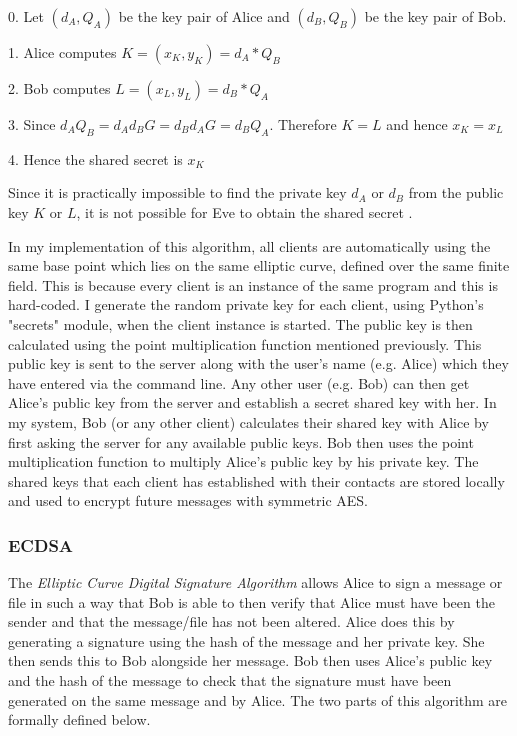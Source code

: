 \documentclass[12pt,a4paper]{article}
\begin{document}
\vspace{1mm}

0. \space Let $(d_A,Q_A)$ be the key pair of Alice and $(d_B,Q_B)$ be the key pair of Bob.

1. \space Alice computes $K = (x_K,y_K) = d_A * Q_B$

2. \space Bob computes $L = (x_L,y_L) = d_B * Q_A$

3. \space Since $d_AQ_B = d_Ad_BG = d_Bd_AG = d_BQ_A$. Therefore $K = L$ and hence $x_K = x_L$

4. \space Hence the shared secret is $x_K$

\vspace{1mm}

Since it is practically impossible to find the private key $d_A$ or $d_B$ from the public key $K$ or $L$, 
it is not possible for Eve to obtain the shared secret \cite{jurivsic1997elliptic,anoop2007elliptic,silverman2009arithmetic,brown2009standards}. 

\vspace{5mm}

In my implementation of this algorithm, all clients are automatically using the same base point which lies 
on the same elliptic curve, defined over the same finite field. 
This is because every client is an instance of the same program and this is hard-coded. 
I generate the random private key for each client, using Python's "secrets" module, when the client instance is started. 
The public key is then calculated using the point multiplication function mentioned previously. 
This public key is sent to the server along with the user's name (e.g. Alice) which they have entered via the command line. 
Any other user (e.g. Bob) can then get Alice's public key from the server and establish a secret shared key with her. 
In my system, Bob (or any other client) calculates their shared key with Alice by first asking the server 
for any available public keys. 
Bob then uses the point multiplication function to multiply Alice's public key by his private key. 
The shared keys that each client has established with their contacts are stored locally 
and used to encrypt future messages with symmetric AES. 

\subsubsection{ECDSA} \noindent \label{ECDSA}
The \emph{Elliptic Curve Digital Signature Algorithm} allows Alice to sign a message or file in such a way that Bob is able to then 
verify that Alice must have been the sender and that the message/file has not been altered. 
Alice does this by generating a signature using the hash of the message and her private key. 
She then sends this to Bob alongside her message. 
Bob then uses Alice's public key and the hash of the message to check that the signature must have been generated on the same message and by Alice. 
The two parts of this algorithm are formally defined below. 
\end{document}
